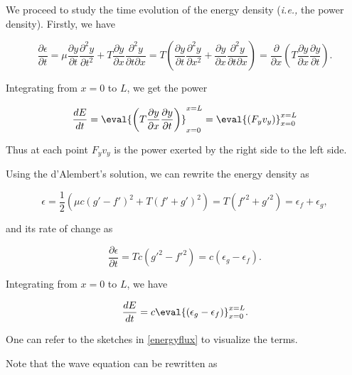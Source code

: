 \documentclass[a4paper,12pt]{report}
\begin{document}
We proceed to study the time evolution of the energy density (\textit{i.e.,} the power density). Firstly, we have

\begin{equation}
	\frac{\partial \epsilon  }{\partial t} = \mu \frac{\partial y}{\partial t} \frac{\partial^2 y}{\partial t^2} + T \frac{\partial y}{\partial x} \frac{\partial^2 y}{ \partial t \partial x} = T\left( \frac{\partial y}{\partial t} \frac{\partial^2 y}{\partial x^2}+ \frac{\partial y}{\partial x} \frac{\partial^2 y}{\partial t \partial x}    \right) = \frac{\partial }{\partial x} \left( T \frac{\partial y}{\partial x} \frac{\partial y}{\partial t}  \right).  
\end{equation}

Integrating from \(x = 0 \) to \(L\), we get the power

\begin{equation}
	\frac{dE}{dt} = \eval{\left( T \frac{\partial y}{\partial x} \frac{\partial y}{\partial t}  \right)}_{x=0}^{x=L} = \eval{\left( F_{y}v_{y}   \right)}_{x=0}^{x=L}  
\end{equation}

Thus at each point \(F_{y} v_{y} \) is the power exerted by the right side to the left side.

Using the d'Alembert's solution, we can rewrite the energy density as 

\begin{equation}
	\epsilon = \frac{1}{2}\left( \mu c \left( g'-f' \right)^2 +T(f'+g')^2\right) = T(f'^2+g'^2) = \epsilon _{f} + \epsilon _{g}  ,
\end{equation}

and its rate of change as

\begin{equation}
	\frac{\partial \epsilon }{\partial t} =  Tc \left( g'^2-f'^2 \right) = c(\epsilon _{g} - \epsilon _{f}  ).
\end{equation}

Integrating from \(x=0 \) to \(L\), we have

\begin{equation}
	\frac{dE}{dt} = c \eval{(\epsilon _{g}- \epsilon _{f}  )}_{x=0}^{x=L}. 
\end{equation}

One can refer to the sketches in \cref{energyflux} to visualize the terms.


Note that the wave equation can be rewritten as 
\end{document}
